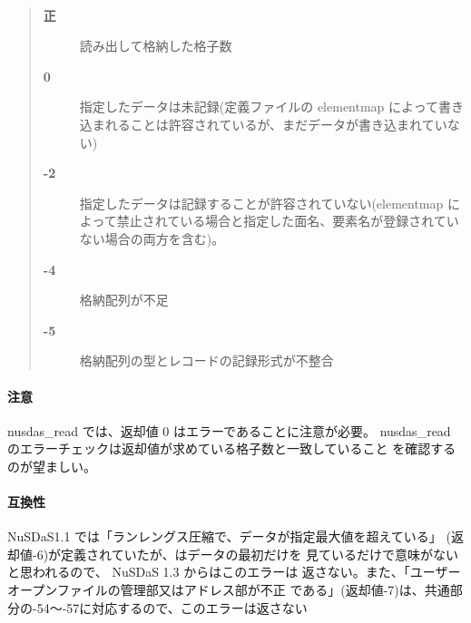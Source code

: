 \paragraph{\ResultCode}
\begin{quote}
\begin{description}
\item[{\bf 正}] 読み出して格納した格子数
\item[{\bf 0}] 指定したデータは未記録(定義ファイルの elementmap によって書き込まれることは許容されているが、まだデータが書き込まれていない)
\item[{\bf -2}] 指定したデータは記録することが許容されていない(elementmap によって禁止されている場合と指定した面名、要素名が登録されていない場合の両方を含む)。
\item[{\bf -4}] 格納配列が不足
\item[{\bf -5}] 格納配列の型とレコードの記録形式が不整合
\end{description}\end{quote}

\paragraph{ 注意 }
nusdas\_read では、返却値 0 はエラーであることに注意が必要。
nusdas\_read のエラーチェックは返却値が求めている格子数と一致していること
を確認するのが望ましい。
\paragraph{ 互換性 }
NuSDaS1.1 では「ランレングス圧縮で、データが指定最大値を超えている」
(返却値-6)が定義されていたが、はデータの最初だけを
見ているだけで意味がないと思われるので、 NuSDaS 1.3 からはこのエラーは
返さない。また、「ユーザーオープンファイルの管理部又はアドレス部が不正
である」(返却値-7)は、共通部分の-54〜-57に対応するので、このエラーは返さない
